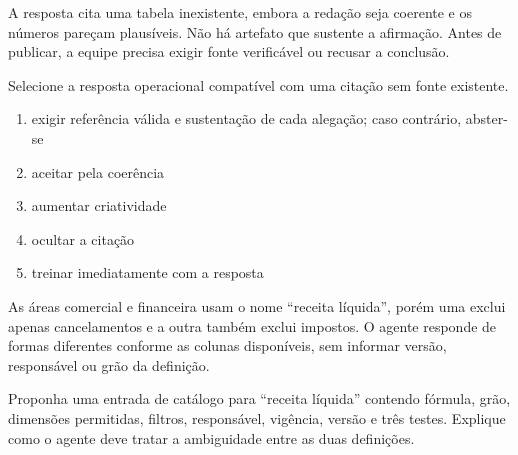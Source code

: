 
\TextoBase

A resposta cita uma tabela inexistente, embora a redação seja coerente e os números pareçam plausíveis. Não há artefato que sustente a afirmação. Antes de publicar, a equipe precisa exigir fonte verificável ou recusar a conclusão.

\FonteDidatica

\Comando Selecione a resposta operacional compatível com uma citação sem fonte existente.

\begin{enumerate}[label=\Alph*)]

\item exigir referência válida e sustentação de cada alegação; caso contrário, abster-se

\item aceitar pela coerência

\item aumentar criatividade

\item ocultar a citação

\item treinar imediatamente com a resposta

\end{enumerate}


\TextoBase

As áreas comercial e financeira usam o nome ``receita líquida'', porém uma exclui apenas cancelamentos e a outra também exclui impostos. O agente responde de formas diferentes conforme as colunas disponíveis, sem informar versão, responsável ou grão da definição.

\FonteDidatica

\Comando Proponha uma entrada de catálogo para ``receita líquida'' contendo fórmula, grão, dimensões permitidas, filtros, responsável, vigência, versão e três testes. Explique como o agente deve tratar a ambiguidade entre as duas definições.


\TextoBase

